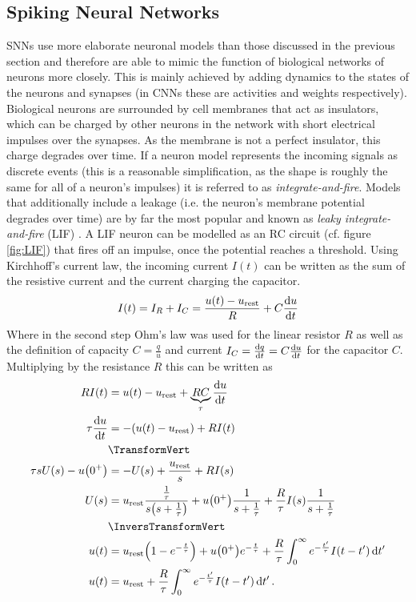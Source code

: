 \subsection{Spiking Neural Networks}
SNNs use more elaborate neuronal models than those discussed in the previous section and therefore are able to mimic the function of biological networks of neurons more closely. This is mainly achieved by adding dynamics to the states of the neurons and synapses (in CNNs these are activities and weights respectively). Biological neurons are surrounded by cell membranes that act as insulators, which can be charged by other neurons in the network with short electrical impulses over the synapses. As the membrane is not a perfect insulator, this charge degrades over time. If a neuron model represents the incoming signals as discrete events (this is a reasonable simplification, as the shape is roughly the same for all of a neuron's impulses) it is referred to as \emph{integrate-and-fire}. Models that additionally include a leakage (i.e. the neuron's membrane potential degrades over time) are by far the most popular and known as \emph{leaky integrate-and-fire} (LIF) \cite{hodgkin1952quantitative,burkitt2006review}. A LIF neuron can be modelled as an RC circuit (cf. figure \ref{fig:LIF}) that fires off an impulse, once the potential reaches a threshold. Using Kirchhoff's current law, the incoming current $I(t)$ can be written as the sum of the resistive current and the current charging the capacitor.
\begin{align}
    I(t) = I_R + I_C =  \frac{u(t) - u_\mathrm{rest}}{R}+C\dv{u}{t}
\end{align}
Where in the second step Ohm's law was used for the linear resistor $R$ as well as the definition of capacity $C=\frac{q}{u}$ and current $I_C=\dv{q}{t}=C\dv{u}{t}$ for the capacitor $C$. Multiplying by the resistance $R$ this can be written as
\begin{align}
    R I(t) &=  u(t) - u_\mathrm{rest}+\underbrace{RC}_{\tau}\dv{u}{t}\\
    \tau \dv{u}{t}&= -\qty(u(t)-u_\mathrm{rest})+RI(t)\label{eq:LIF}\\
    &\TransformVert\\
    \tau s U(s) - u\qty(0^+) &= -U(s)+\frac{u_\mathrm{rest}}{s}+R I(s)\\
    U(s) &= u_\mathrm{rest}\frac{\frac{1}{\tau}}{s\qty(s+\frac{1}{\tau})}+u\qty(0^+)\frac{1}{s+\frac{1}{\tau}}+\frac{R}{\tau}I(s) \frac{1}{s+\frac{1}{\tau}}\\
    &\InversTransformVert\\
    u(t) &= u_\mathrm{rest}\qty(1-e^{-\frac{t}{\tau}})+u\qty(0^+)e^{-\frac{t}{\tau}}+\frac{R}{\tau}\int_0^\infty e^{-\frac{t'}{\tau}}I(t-t')\dd{t'}\\
    u(t)&=u_\mathrm{rest}+\frac{R}{\tau}\int_0^\infty e^{-\frac{t'}{\tau}}I(t-t')\dd{t'}\label{eq:LIF-solution}.
\end{align}
